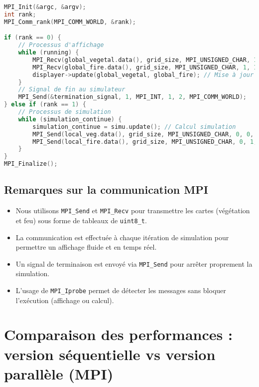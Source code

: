\documentclass[a4paper,12pt]{article}
\begin{document}
\begin{lstlisting}[language=C++, caption={Séparation des processus MPI pour la simulation et l'affichage}, label={lst:mpi_separation}]
MPI_Init(&argc, &argv);
int rank;
MPI_Comm_rank(MPI_COMM_WORLD, &rank);

if (rank == 0) {
    // Processus d'affichage
    while (running) {
        MPI_Recv(global_vegetal.data(), grid_size, MPI_UNSIGNED_CHAR, 1, 0, MPI_COMM_WORLD, MPI_STATUS_IGNORE);
        MPI_Recv(global_fire.data(), grid_size, MPI_UNSIGNED_CHAR, 1, 1, MPI_COMM_WORLD, MPI_STATUS_IGNORE);
        displayer->update(global_vegetal, global_fire); // Mise à jour SDL
    }
    // Signal de fin au simulateur
    MPI_Send(&termination_signal, 1, MPI_INT, 1, 2, MPI_COMM_WORLD);
} else if (rank == 1) {
    // Processus de simulation
    while (simulation_continue) {
        simulation_continue = simu.update(); // Calcul simulation
        MPI_Send(local_veg.data(), grid_size, MPI_UNSIGNED_CHAR, 0, 0, MPI_COMM_WORLD); // Envoi cartes
        MPI_Send(local_fire.data(), grid_size, MPI_UNSIGNED_CHAR, 0, 1, MPI_COMM_WORLD);
    }
}
MPI_Finalize();
\end{lstlisting}

\subsection{Remarques sur la communication MPI}

\begin{itemize}
    \item Nous utilisons \texttt{MPI\_Send} et \texttt{MPI\_Recv} pour transmettre les cartes (végétation et feu) sous forme de tableaux de \texttt{uint8\_t}.
    \item La communication est effectuée à chaque itération de simulation pour permettre un affichage fluide et en temps réel.
    \item Un signal de terminaison est envoyé via \texttt{MPI\_Send} pour arrêter proprement la simulation.
    \item L'usage de \texttt{MPI\_Iprobe} permet de détecter les messages sans bloquer l'exécution (affichage ou calcul).
\end{itemize}



\section{Comparaison des performances : version séquentielle vs version parallèle (MPI)}
\end{document}

